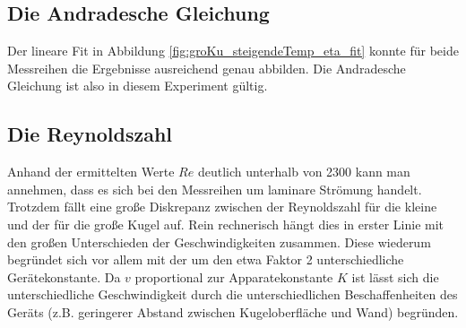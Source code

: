 
\subsection[]{Die Andradesche Gleichung}
Der lineare Fit in Abbildung \ref{fig:groKu_steigendeTemp_eta_fit} konnte für beide Messreihen die
Ergebnisse ausreichend genau abbilden. 
Die Andradesche Gleichung ist also in diesem Experiment gültig.

\subsection[]{Die Reynoldszahl}
Anhand der ermittelten Werte $Re$ deutlich unterhalb von 2300 kann man annehmen, dass es sich bei den Messreihen um laminare Strömung handelt.
Trotzdem fällt eine große Diskrepanz zwischen der Reynoldszahl für die kleine und der für die große Kugel auf.
Rein rechnerisch hängt dies in erster Linie mit den großen Unterschieden der Geschwindigkeiten zusammen.
Diese wiederum begründet sich vor allem mit der um den etwa Faktor 2 unterschiedliche Gerätekonstante.
Da $v$ proportional zur Apparatekonstante $K$ ist lässt sich die unterschiedliche Geschwindigkeit 
durch die unterschiedlichen Beschaffenheiten des Geräts (z.B. geringerer Abstand zwischen Kugeloberfläche und Wand) begründen.







